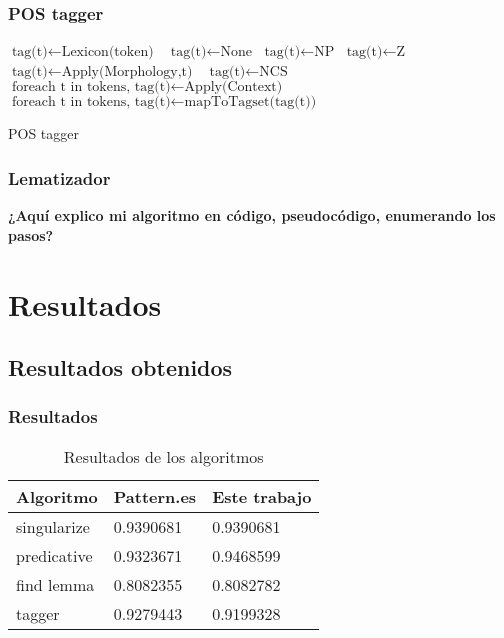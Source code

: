 \documentclass{beamer}
\begin{document}
\begin{frame}
\frametitle{POS tagger}
\begin{algorithm}[H]
\begin{scriptsize}
    \begin{algorithmic}[1]
	 	 $\text{tag(t)} \gets \text{Lexicon(token)}$ \Else $\text{ tag(t)}  \gets \text{None}$ \EndIf 
            \EndFor   
      $\text{tag(t)} \gets \text{NP}$  $\text{tag(t)} \gets \text{Z}$  $\text{tag(t)} \gets \text{Apply(Morphology,t)}$ 
     \Else $ \text{ tag(t)} \gets \text{NCS}$ \EndIf 
    \EndFor 
      $\text{foreach t in tokens, tag(t)} \gets \text{Apply(Context)}$ \EndIf  
      $\text{foreach t in tokens, tag(t)} \gets \text{mapToTagset(tag(t))}$ \EndIf       
        \EndProcedure
    \end{algorithmic}
    \label{alg:rAP}
    \caption{POS tagger}
    \end{scriptsize}
\end{algorithm}
\end{frame}







\begin{frame}
\frametitle{Lematizador}
\textbf{¿Aquí explico mi algoritmo en código, pseudocódigo, enumerando los pasos?}
\end{frame}

\section{Resultados}
\subsection{Resultados obtenidos}
\begin{frame}
\frametitle{Resultados}
\begin{table}
\begin{tabular}{l l l}
\toprule
\textbf{Algoritmo} & \textbf{Pattern.es} & \textbf{Este trabajo}\\
\midrule
singularize & 0.9390681  & 0.9390681 \\
predicative & 0.9323671  & 0.9468599 \\
find lemma  & 0.8082355  & 0.8082782 \\
tagger      & 0.9279443  & 0.9199328 \\
\bottomrule
\end{tabular}
\caption{Resultados de los algoritmos}
\end{table}
\end{frame}
\end{document}
